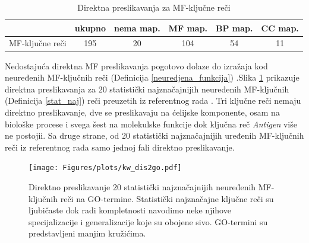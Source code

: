 \begin{table}[htpb]
\begin{tabular}{|r|c|c|c|c|c|}
  \hline
                   & ukupno & nema map. &  MF map. & BP map. & CC map.      \\
  \hline
   MF-ključne reči & 195    &  20       &  104     & 54      & 11           \\
  \hline
\end{tabular}
  \centering
  \caption{Direktna preslikavanja za MF-ključne reči}
  \label{tab:direktna_map}
\end{table}

Nedostajuća direktna MF preslikavanja pogotovo dolaze do izražaja kod neuređenih MF-ključnih reči (Definicija \ref{neuredjena_funkcija}) .Slika
\ref{fig:KWtop20dis} prikazuje direktna preslikavanja za 20 statistički
najznačajnijih neuređenih MF-ključnih (Definicija \ref{stat_naj}) reči preuzetih iz referentnog rada
\parencite{Xie2007}.  Tri ključne reči nemaju direktno preslikavanje, dve se
preslikavaju na ćelijske komponente, osam na biološke procese i svega šest na
molekulske funkcije dok ključna reč \textit{Antigen} više ne postojii. Sa druge
strane, od 20 statistički najznačajnijih uređenih MF-ključnih reči iz
referentnog rada samo jednoj fali direktno preslikavanje.

\begin{figure}[!th]
\centering
\texttt{[image: Figures/plots/kw\_dis2go.pdf]}
\caption {
  Direktno preslikavanje 20 statistički najznačajnijih neuređenih MF-ključnih reči
  \parencite{Xie2007} na GO-termine.  Statistički najznačajne ključne reči su
  ljubičaste dok radi kompletnosti navodimo neke njihove specijalizacije i
  generalizacije koje su obojene sivo. GO-termini su predstavljeni manjim
  kružićima.
}
\label{fig:KWtop20dis}
\end{figure}

